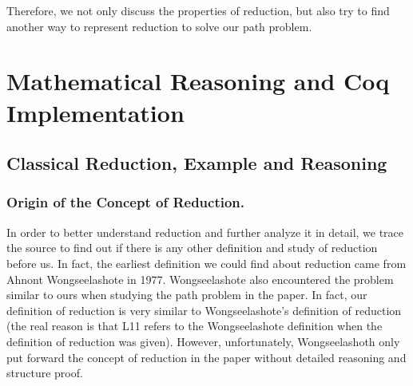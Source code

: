 \documentclass[a4paper,12pt,twoside,openright]{report}
\begin{document}
Therefore, we not only discuss the properties of reduction, but also try to find another way to represent reduction to solve our path problem.



%
%
%

\chapter{Mathematical Reasoning and Coq Implementation} 


\section{Classical Reduction, Example and Reasoning}
\subsection{Origin of the Concept of Reduction.}
In order to better understand reduction and further analyze it in detail, we trace the source to find out if there is any other definition and study of reduction before us. 
In fact, the earliest definition we could find about reduction came from Ahnont Wongseelashote in 1977\cite{WONGSEELASHOTE197955}. Wongseelashote also encountered the problem similar to ours when studying the path problem in the paper. In fact, our definition of reduction is very similar to Wongseelashote's definition of reduction (the real reason is that L11 refers to the Wongseelashote definition when the definition of reduction was given). However, unfortunately, Wongseelashoth only put forward the concept of reduction in the paper without detailed reasoning and structure proof.
\end{document}
